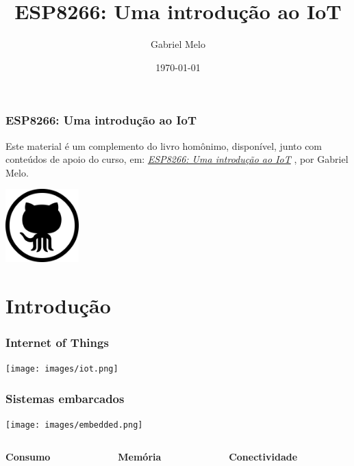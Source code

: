 \documentclass[10pt, compress]{beamer}
\title{ESP8266: Uma introdução ao IoT}
\subtitle{}
\date{\today}
\author{Gabriel Melo}
\institute{
  \vspace{20pt}
  \begin{center}
    \texttt{[image: images/emakersjr\_logo.png]}
  \end{center}
}
\begin{document}
\maketitle


\begin{frame}[fragile]
  \frametitle{ESP8266: Uma introdução ao IoT}

  Este material é um complemento do livro homônimo, disponível, junto com conteúdos de apoio do curso, em: \href{https://github.com/GabrielMMelo/esp8266\_course}{ \textit{ESP8266: Uma introdução ao IoT}}
  , por Gabriel Melo.

  \begin{center}
    \vspace{20pt}
    \includegraphics[width=80pt]{images/github.png}\\
  \end{center}
\end{frame}
\section{Introdução}
\begin{frame}
  \frametitle{Internet of Things}
  \begin{center}
    \texttt{[image: images/iot.png]}\\
  \end{center}
\end{frame}

\begin{frame}
  \frametitle{Sistemas embarcados}
   \begin{center}
    \texttt{[image: images/embedded.png]}\\
     \vspace{10pt}
    \begin{columns}
      \begin{column}{0.38\textwidth}
      \begin{center}
        \textbf{Consumo}
      \end{center}
      \end{column}
      \begin{column}{0.38\textwidth}
      \begin{center}
        \textbf{Memória}
      \end{center}
      \end{column}
      \begin{column}{0.38\textwidth}
      \begin{center}
        \textbf{Conectividade}
      \end{center}
      \end{column}
    \end{columns}
  \end{center}
\end{frame}
\end{document}
